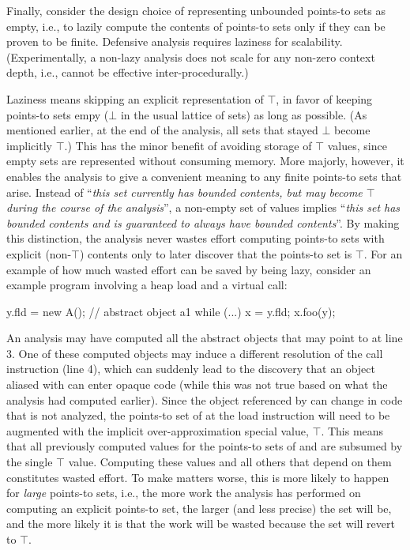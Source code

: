Finally, consider the design choice of representing unbounded points-to sets as empty, i.e., to lazily compute the contents of points-to sets only if they can be proven to be finite. Defensive analysis requires laziness for scalability. (Experimentally, a non-lazy analysis does not scale for any non-zero context depth, i.e., cannot be effective inter-procedurally.)

Laziness means skipping an explicit representation of $\top$, in favor of keeping points-to sets empy ($\bot$ in the usual lattice of sets) as long as possible. (As mentioned earlier, at the end of the analysis, all sets that stayed $\bot$ become implicitly $\top$.) This has the minor benefit of avoiding storage of $\top$ values, since empty sets are represented without consuming memory. More majorly, however, it enables the analysis to give a convenient meaning to any finite points-to sets that arise. Instead of ``\emph{this set currently has bounded contents, but may become $\top$ during the course of the analysis}'', a non-empty set of values implies ``\emph{this set has bounded contents and is guaranteed to always have bounded contents}''. By making this distinction, the analysis never wastes effort computing points-to sets with explicit (non-$\top$) contents only to later discover that the points-to set is $\top$. For an example of how much wasted effort can be saved by being lazy, consider an example program involving a heap load and a virtual call:

\begin{javaBoxLn}
y.fld = new A();  // abstract object a1
while (...) {    
    x = y.fld;
    x.foo(y);
}
\end{javaBoxLn}

An analysis may have computed all the abstract objects that  may point to at line 3. One of these computed objects may induce a different resolution of the call instruction (line 4), which can suddenly lead to the discovery that an object aliased with  can enter opaque code (while this was not true based on what the analysis had computed earlier). Since the object referenced by  can change in code that is not analyzed, the points-to set of  at the load instruction will need to be augmented with the implicit over-approximation special value, $\top$. This means that all previously computed values for the points-to sets of  and  are subsumed by the single $\top$ value. Computing these values and all others that depend on them constitutes wasted effort. To make matters worse, this is more likely to happen for \emph{large} points-to sets, i.e., the more work the analysis has performed on computing an explicit points-to set, the larger (and less precise) the set will be, and the more likely it is that the work will be wasted because the set will revert to $\top$.


